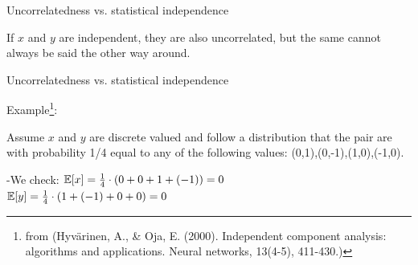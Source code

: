\begin{frame}{Uncorrelatedness vs. statistical independence}

If $x$ and $y$ are independent, they are also uncorrelated, but the same cannot always be said the other way around.

\pause


\end{frame}

\begin{frame}{Uncorrelatedness vs. statistical independence}


Example\footnote{ from (Hyv\"arinen, A., \& Oja, E. (2000). Independent component analysis: algorithms and applications. Neural networks, 13(4-5), 411-430.)}:

Assume $x$ and $y$ are discrete valued and follow a distribution that the pair are with probability 1/4 equal to any of the following
values: (0,1),(0,-1),(1,0),(-1,0). 


\pause

-We check:
$\mathbb{E} \lbrack x \rbrack = \frac{1}{4} \cdot (0 + 0 + 1 + (-1)) = 0$\\[2mm]
$\mathbb{E} \lbrack y \rbrack = \frac{1}{4} \cdot (1 + (-1) + 0 + 0) = 0$\\


\end{frame}

